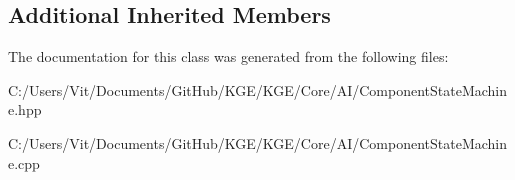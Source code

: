 \subsection*{Additional Inherited Members}


The documentation for this class was generated from the following files\-:\begin{DoxyCompactItemize}
\item 
C\-:/\-Users/\-Vit/\-Documents/\-Git\-Hub/\-K\-G\-E/\-K\-G\-E/\-Core/\-A\-I/Component\-State\-Machine.\-hpp\item 
C\-:/\-Users/\-Vit/\-Documents/\-Git\-Hub/\-K\-G\-E/\-K\-G\-E/\-Core/\-A\-I/Component\-State\-Machine.\-cpp\end{DoxyCompactItemize}
